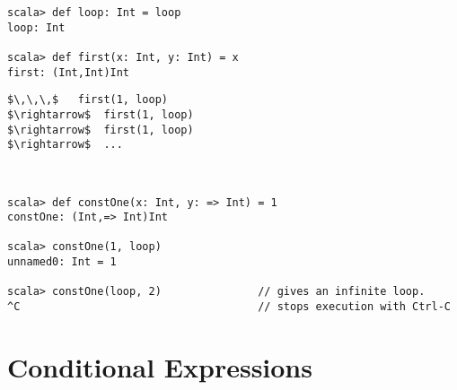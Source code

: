 
\begin{lstlisting}
scala> def loop: Int = loop
loop: Int

scala> def first(x: Int, y: Int) = x
first: (Int,Int)Int
\end{lstlisting}
\begin{lstlisting}
$\,\,\,$   first(1, loop)
$\rightarrow$  first(1, loop)
$\rightarrow$  first(1, loop)
$\rightarrow$  ...
\end{lstlisting}

\example\ 
 
\begin{lstlisting}
scala> def constOne(x: Int, y: => Int) = 1
constOne: (Int,=> Int)Int

scala> constOne(1, loop)
unnamed0: Int = 1

scala> constOne(loop, 2)               // gives an infinite loop.
^C                                     // stops execution with Ctrl-C
\end{lstlisting}

\section{Conditional Expressions}


